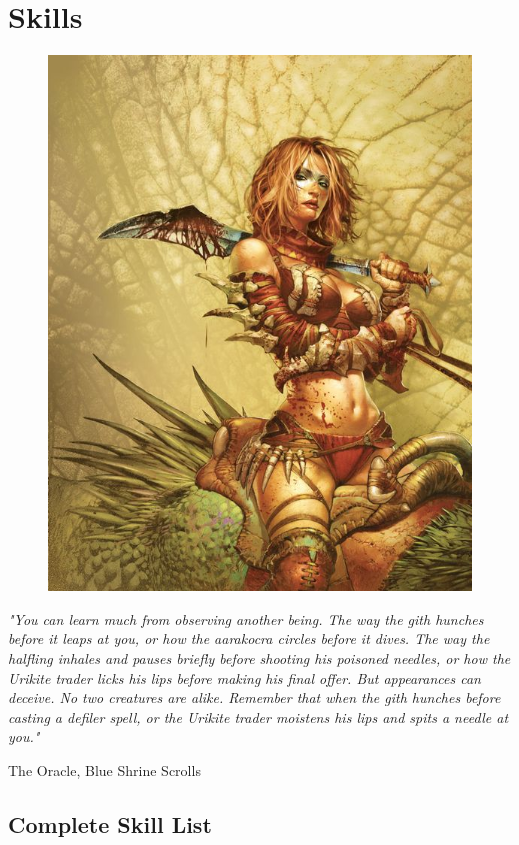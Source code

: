 \chapter{Skills}\label{chap:skills}

\begin{figure}[H]
\centering
\includegraphics[width=0.6\linewidth]{images/rider.jpg}
\end{figure}

\epigraph{\textit{
    "You can learn much from observing another being. The way the gith hunches before it leaps at you, or how the aarakocra
    circles before it dives. The way the halfling inhales and pauses briefly before shooting his poisoned needles, or how the
    Urikite trader licks his lips before making his final offer. But appearances can deceive. No two creatures are alike.
    Remember that when the gith hunches before casting a defiler spell, or the Urikite trader moistens his lips and spits a
    needle at you." } } { The Oracle, Blue Shrine Scrolls }

\newpage

\section{Complete Skill List}

